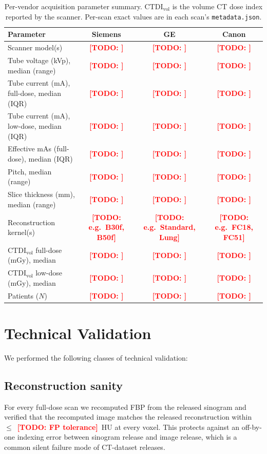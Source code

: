 \documentclass[twoside,11pt]{article}
\newcommand{\todo}[1]{\textcolor{red}{\textbf{[TODO: #1]}}}
\begin{document}
\begin{table}[h]
    \centering
    \small
    \setlength{\tabcolsep}{4pt}
    \begin{tabular}{lccc}
        \toprule
        \textbf{Parameter} & \textbf{Siemens} & \textbf{GE} & \textbf{Canon} \\
        \midrule
        Scanner model(s)                          & \todo{} & \todo{} & \todo{} \\
        Tube voltage (kVp), median (range)        & \todo{} & \todo{} & \todo{} \\
        Tube current (mA), full-dose, median (IQR) & \todo{} & \todo{} & \todo{} \\
        Tube current (mA), low-dose, median (IQR)  & \todo{} & \todo{} & \todo{} \\
        Effective mAs (full-dose), median (IQR)    & \todo{} & \todo{} & \todo{} \\
        Pitch, median (range)                      & \todo{} & \todo{} & \todo{} \\
        Slice thickness (mm), median (range)       & \todo{} & \todo{} & \todo{} \\
        Reconstruction kernel(s)                   & \todo{e.g.\ B30f, B50f} & \todo{e.g.\ Standard, Lung} & \todo{e.g.\ FC18, FC51} \\
        CTDI$_{\textrm{vol}}$ full-dose (mGy), median & \todo{} & \todo{} & \todo{} \\
        CTDI$_{\textrm{vol}}$ low-dose (mGy), median  & \todo{} & \todo{} & \todo{} \\
        Patients ($N$)                             & \todo{} & \todo{} & \todo{} \\
        \bottomrule
    \end{tabular}
    \caption{Per-vendor acquisition parameter summary. CTDI$_{\textrm{vol}}$ is the volume CT dose index reported by the scanner. Per-scan exact values are in each scan's \texttt{metadata.json}.}
    \label{tab:acquisition_params}
\end{table}

\section*{Technical Validation}

We performed the following classes of technical validation:

\subsection*{Reconstruction sanity}
For every full-dose scan we recomputed FBP from the released sinogram and verified that the recomputed image matches the released reconstruction within $\leq$~\todo{FP tolerance}~HU at every voxel. This protects against an off-by-one indexing error between sinogram release and image release, which is a common silent failure mode of CT-dataset releases.
\end{document}
